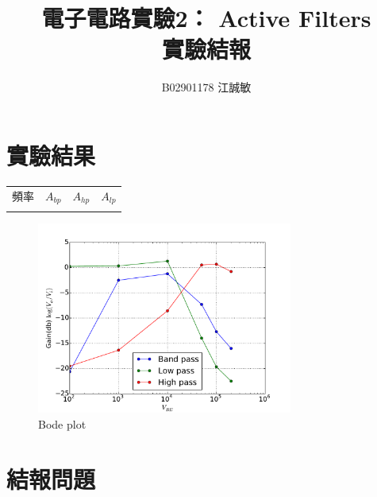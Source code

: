 \documentclass[12pt, a4paper]{article}
\title{ \bf {\Huge 電子電路實驗2： Active Filters}\\ 實驗結報}
\author{B02901178 江誠敏}
\begin{document}
\maketitle


\section{實驗結果}
\begin{center}
  \begin{tabular}{p{3cm}p{3cm}p{3cm}p{3cm}}
	\hline
  頻率 & $A_{bp}$ & $A_{hp}$ & $A_{lp}$\\
	\hhline{====}
  
	\hline
\end{tabular}
\end{center}
\begin{figure}[H]
\begin{center}
  \includegraphics[width=0.75\textwidth]{fig1.pdf}
\end{center}
\caption{Bode plot}
\label{fig:}
\end{figure}
\section{結報問題}
\end{document}

